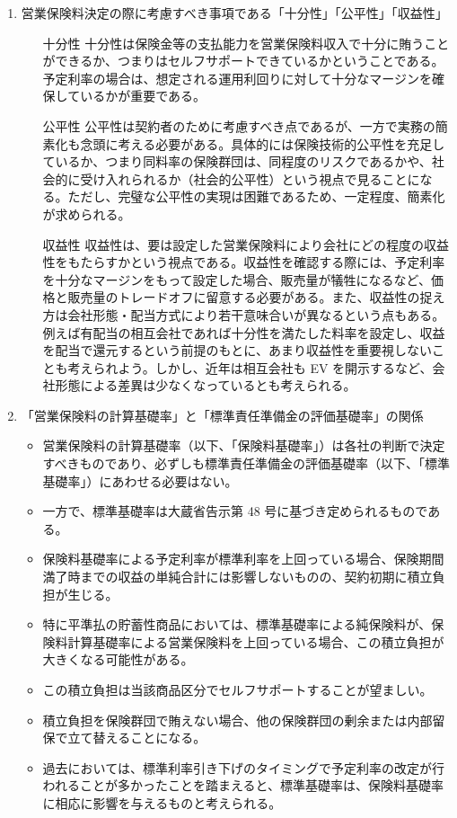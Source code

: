 \documentclass[report,gutter=10mm,fore-edge=10mm,uplatex,dvipdfmx]{jlreq}
\begin{document}
\begin{enumerate}
 \item 営業保険料決定の際に考慮すべき事項である「十分性」「公平性」「収益性」
\begin{itemize}
 \item [十分性]十分性は保険金等の支払能力を営業保険料収入で十分に賄うことができるか、つまりはセルフサポートできているかということである。予定利率の場合は、想定される運用利回りに対して十分なマージンを確保しているかが重要である。
 \item [公平性]公平性は契約者のために考慮すべき点であるが、一方で実務の簡素化も念頭に考える必要がある。具体的には保険技術的公平性を充足しているか、つまり同料率の保険群団は、同程度のリスクであるかや、社会的に受け入れられるか（社会的公平性）という視点で見ることになる。ただし、完璧な公平性の実現は困難であるため、一定程度、簡素化が求められる。
 \item [収益性]収益性は、要は設定した営業保険料により会社にどの程度の収益性をもたらすかという視点である。収益性を確認する際には、予定利率を十分なマージンをもって設定した場合、販売量が犠牲になるなど、価格と販売量のトレードオフに留意する必要がある。また、収益性の捉え方は会社形態・配当方式により若干意味合いが異なるという点もある。例えば有配当の相互会社であれば十分性を満たした料率を設定し、収益を配当で還元するという前提のもとに、あまり収益性を重要視しないことも考えられよう。しかし、近年は相互会社も EV を開示するなど、会社形態による差異は少なくなっているとも考えられる。
\end{itemize}
 \item 「営業保険料の計算基礎率」と「標準責任準備金の評価基礎率」の関係
\begin{itemize}
 \item 営業保険料の計算基礎率（以下、「保険料基礎率」）は各社の判断で決定すべきものであり、必ずしも標準責任準備金の評価基礎率（以下、「標準基礎率」）にあわせる必要はない。
 \item 一方で、標準基礎率は大蔵省告示第 48 号に基づき定められるものである。
 \item 保険料基礎率による予定利率が標準利率を上回っている場合、保険期間満了時までの収益の単純合計には影響しないものの、契約初期に積立負担が生じる。
 \item 特に平準払の貯蓄性商品においては、標準基礎率による純保険料が、保険料計算基礎率による営業保険料を上回っている場合、この積立負担が大きくなる可能性がある。
 \item この積立負担は当該商品区分でセルフサポートすることが望ましい。
 \item 積立負担を保険群団で賄えない場合、他の保険群団の剰余または内部留保で立て替えることになる。
 \item 過去においては、標準利率引き下げのタイミングで予定利率の改定が行われることが多かったことを踏まえると、標準基礎率は、保険料基礎率に相応に影響を与えるものと考えられる。
\end{itemize}
\end{enumerate}
\end{document}
